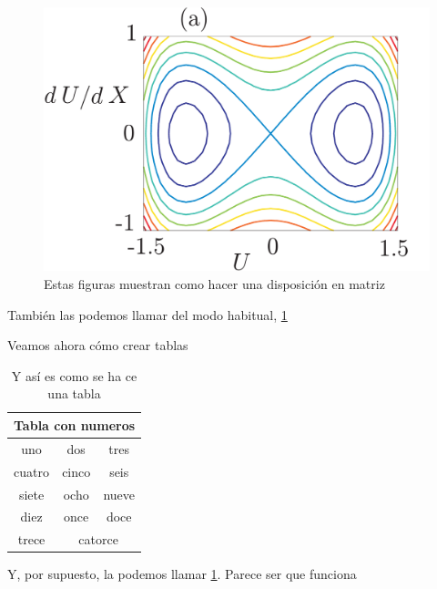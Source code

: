 \documentclass{article}
\begin{document}
\begin{figure}
\begin{center}
\includegraphics[scale=0.25]{figura1}
\caption{Estas figuras muestran como hacer una disposición en matriz} \label{fig1} %
\end{center}
\end{figure}

También las podemos llamar del modo habitual, \ref{fig1} \bigskip


Veamos ahora cómo crear tablas
\begin{table}[H] %
\begin{center}
\begin{tabular}{|c|c|c|} \hline %
\multicolumn{3}{|c|}{Tabla con numeros}\\ \hline
uno&dos&tres\\ \hline \hline
cuatro&cinco&seis\\ \hline
siete&ocho&nueve\\ \hline
diez&once&doce\\ \hline
trece&\multicolumn{2}{|c|}{catorce}\\ \hline
\end{tabular}
\caption{Y así es como se ha ce una tabla}\label{tabla1}
\end{center}
\end{table}

Y, por supuesto, la podemos llamar \ref{tabla1}. Parece ser que funciona
\end{document}
